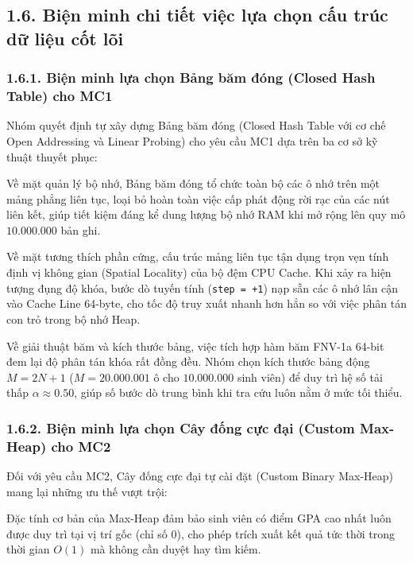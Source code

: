 \documentclass[14pt,a4paper]{extarticle}
\begin{document}
\subsection*{1.6. Biện minh chi tiết việc lựa chọn cấu trúc dữ liệu cốt lõi}
{}

\subsubsection*{1.6.1. Biện minh lựa chọn Bảng băm đóng (Closed Hash Table) cho MC1}
{}

Nhóm quyết định tự xây dựng Bảng băm đóng (Closed Hash Table với cơ chế Open Addressing và Linear Probing) cho yêu cầu MC1 dựa trên ba cơ sở kỹ thuật thuyết phục:

Về mặt quản lý bộ nhớ, Bảng băm đóng tổ chức toàn bộ các ô nhớ trên một mảng phẳng liên tục, loại bỏ hoàn toàn việc cấp phát động rời rạc của các nút liên kết, giúp tiết kiệm đáng kể dung lượng bộ nhớ RAM khi mở rộng lên quy mô $10.000.000$ bản ghi.

Về mặt tương thích phần cứng, cấu trúc mảng liên tục tận dụng trọn vẹn tính định vị không gian (Spatial Locality) của bộ đệm CPU Cache. Khi xảy ra hiện tượng đụng độ khóa, bước dò tuyến tính (\texttt{step = +1}) nạp sẵn các ô nhớ lân cận vào Cache Line 64-byte, cho tốc độ truy xuất nhanh hơn hẳn so với việc phân tán con trỏ trong bộ nhớ Heap.

Về giải thuật băm và kích thước bảng, việc tích hợp hàm băm FNV-1a 64-bit đem lại độ phân tán khóa rất đồng đều. Nhóm chọn kích thước bảng động $M = 2N + 1$ ($M = 20.000.001$ ô cho $10.000.000$ sinh viên) để duy trì hệ số tải thấp $\alpha \approx 0.50$, giúp số bước dò trung bình khi tra cứu luôn nằm ở mức tối thiểu.

\subsubsection*{1.6.2. Biện minh lựa chọn Cây đống cực đại (Custom Max-Heap) cho MC2}
{}

Đối với yêu cầu MC2, Cây đống cực đại tự cài đặt (Custom Binary Max-Heap) mang lại những ưu thế vượt trội:

Đặc tính cơ bản của Max-Heap đảm bảo sinh viên có điểm GPA cao nhất luôn được duy trì tại vị trí gốc (chỉ số 0), cho phép trích xuất kết quả tức thời trong thời gian $O(1)$ mà không cần duyệt hay tìm kiếm.
\end{document}
